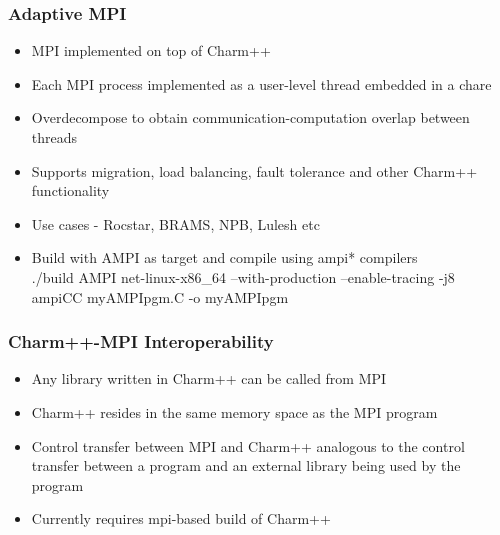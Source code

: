 \begin{frame}[fragile]

  \frametitle{Adaptive MPI}

  \begin{itemize}
    \item MPI implemented on top of Charm++ 
    \item Each MPI process implemented as a user-level thread embedded in a
    chare
    \item Overdecompose to obtain communication-computation overlap between
    threads
    \item Supports migration, load balancing, fault tolerance and other Charm++
    functionality
    \item Use cases - Rocstar, BRAMS, NPB, Lulesh etc
    \item Build with AMPI as target and compile using ampi* compilers\\
    ./build AMPI net-linux-x86\_64 --with-production --enable-tracing -j8\\
    ampiCC myAMPIpgm.C -o myAMPIpgm
  \end{itemize}
\end{frame}

\begin{frame}[fragile]

  \frametitle{Charm++-MPI Interoperability}

  \begin{itemize}
    \item Any library written in Charm++ can be called from MPI
    \pause
    \item Charm++ resides in the same memory space as the MPI program
    \item Control transfer between MPI and Charm++ analogous to the control transfer
    between a program and an external library being used by the program
    \pause
    \item Currently requires mpi-based build of Charm++

  \end{itemize}
\end{frame}

